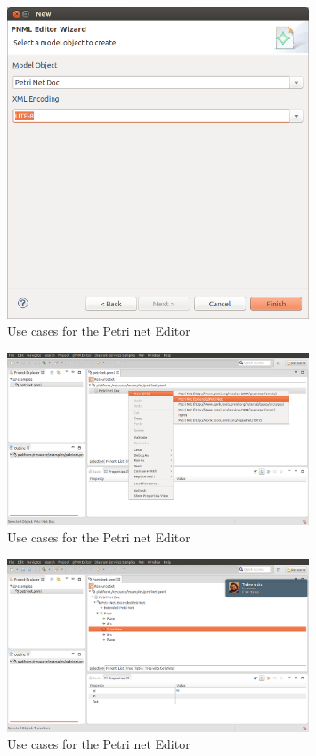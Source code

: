 \begin{figure}[htp]
\begin{center}
  \includegraphics[width=0.8\textwidth]{image/petrinet3.png}
  \caption{Use cases for the Petri net Editor}
  \label{fig:petrinet3}
\end{center}
\end{figure}


\begin{figure}[htp]
\begin{center}
  \includegraphics[width=0.8\textwidth]{image/petrinet4.png}
  \caption{Use cases for the Petri net Editor}
  \label{fig:petrinet4}
\end{center}
\end{figure}


\begin{figure}[htp]
\begin{center}
  \includegraphics[width=0.8\textwidth]{image/petrinet5.png}
  \caption{Use cases for the Petri net Editor}
  \label{fig:petrinet5}
\end{center}
\end{figure}

